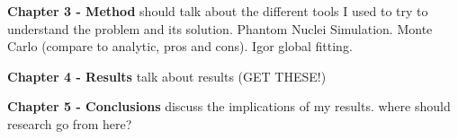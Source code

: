 	\textbf{Chapter 3 - Method}
	should talk about the different tools I used to try to understand the problem and its solution.
	Phantom Nuclei Simulation.
	Monte Carlo (compare to analytic, pros and cons).
	Igor global fitting.
	
	\textbf{Chapter 4 - Results}
	talk about results (GET THESE!)
	
	\textbf{Chapter 5 - Conclusions}
	discuss the implications of my results.
	where should research go from here?
		
		
		
		
		
		
		
		
		
		